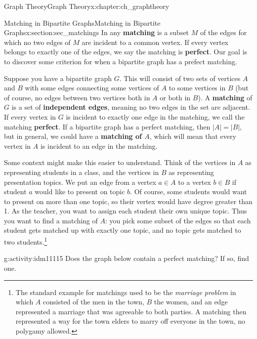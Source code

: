 \documentclass[oneside,10pt,]{book}
\newcommand{\terminology}[1]{\textbf{#1}}
\numberwithin{equation}{chapter}
\newcommand{\card}[1]{\left| #1 \right|}
\begin{document}
\begin{chapterptx}{Graph Theory}{}{Graph Theory}{}{}{x:chapter:ch_graphtheory}
%
%
\typeout{************************************************}
\typeout{************************************************}
%
\begin{sectionptx}{Matching in Bipartite Graphs}{}{Matching in Bipartite Graphs}{}{}{x:section:sec_matchings}
In any \terminology{matching} is a subset \(M\) of the edges for which no two edges of \(M\) are incident to a common vertex.  If every vertex belongs to exactly one of the edges, we say the matching is \terminology{perfect}. Our goal is to discover some criterion for when a bipartite graph has a prefect matching.%
\par
{} Suppose you have a bipartite graph \(G\). This will consist of two sets of vertices \(A\) and \(B\) with some edges connecting some vertices of \(A\) to some vertices in \(B\) (but of course, no edges between two vertices both in \(A\) or both in \(B\)). A \terminology{matching} of \(G\) is a set of \terminology{independent edges}, meaning no two edges in the set are adjacent.  If every vertex in \(G\) is incident to exactly one edge in the matching, we call the matching \terminology{perfect}. If a bipartite graph has a perfect matching, then \(\card{A} = \card{B}\), but in general, we could have a \terminology{matching of \(A\)}, which will mean that every vertex in \(A\) is incident to an edge in the matching.%
\par
Some context might make this easier to understand. Think of the vertices in \(A\) as representing students in a class, and the vertices in \(B\) as representing presentation topics. We put an edge from a vertex \(a \in A\) to a vertex \(b \in B\) if student \(a\) would like to present on topic \(b\). Of course, some students would want to present on more than one topic, so their vertex would have degree greater than 1. As the teacher, you want to assign each student their own unique topic. Thus you want to find a matching of \(A\): you pick some subset of the edges so that each student gets matched up with exactly one topic, and no topic gets matched to two students.\footnote{The standard example for matchings used to be the \emph{marriage problem} in which \(A\) consisted of the men in the town, \(B\) the women, and an edge represented a marriage that was agreeable to both parties.  A matching then represented a way for the town elders to marry off everyone in the town, no polygamy allowed.\label{g:fn:idm11111}}%
\begin{activity}{}{g:activity:idm11115}%
Does the graph below contain a perfect matching? If so, find one.%

\end{activity}
\end{sectionptx}
\end{chapterptx}
\end{document}
